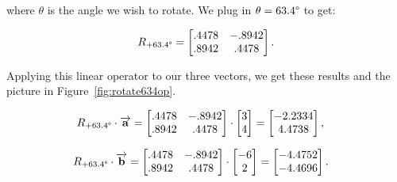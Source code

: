 where $\theta$ is the angle we wish to rotate. We plug in $\theta =
63.4\degree$ to get:

\vspace{-.15in}
\begin{align*}
R_{+63.4\degree} =
\begin{bmatrix}
.4478 & -.8942 \\
.8942 & .4478 \\
\end{bmatrix}.
\end{align*}
\vspace{-.2in}

Applying this linear operator to our three vectors, we get these results and
the picture in Figure~\ref{fig:rotate634op}.

\vspace{-.2in}
\begin{align*}
R_{+63.4\degree} \cdot \overrightarrow{\textbf{a}} &=
\begin{bmatrix}
.4478 & -.8942 \\
.8942 & .4478 \\
\end{bmatrix} \cdot
\begin{bmatrix}
3 \\ 4 \\
\end{bmatrix} =
\begin{bmatrix}
-2.2334 \\ 4.4738 \\
\end{bmatrix},
\end{align*}

\vspace{-.2in}
\begin{align*}
R_{+63.4\degree} \cdot \overrightarrow{\textbf{b}} &=
\begin{bmatrix}
.4478 & -.8942 \\
.8942 & .4478 \\
\end{bmatrix} \cdot
\begin{bmatrix}
-6 \\ 2 \\
\end{bmatrix} =
\begin{bmatrix}
-4.4752 \\ -4.4696 \\
\end{bmatrix}.
\end{align*}

